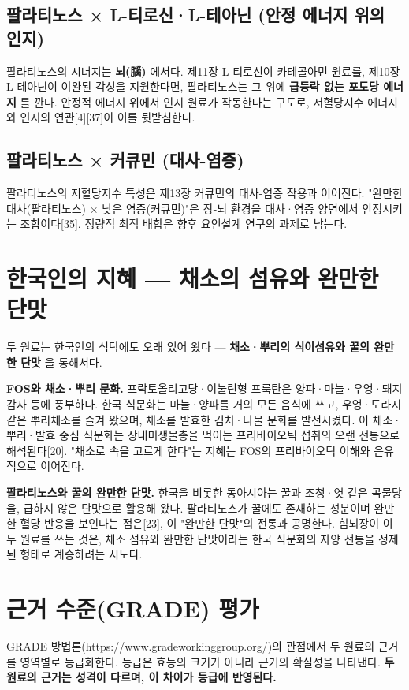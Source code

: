 \documentclass[11pt,oneside]{book}
\begin{document}
\subsection{팔라티노스 × L-티로신·L-테아닌 (안정 에너지 위의 인지)}
팔라티노스의 시너지는 \textbf{뇌(腦)} 에서다. 제11장 L-티로신이 카테콜아민 원료를, 제10장 L-테아닌이 이완된 각성을 지원한다면, 팔라티노스는 그 위에 \textbf{급등락 없는 포도당 에너지} 를 깐다. 안정적 에너지 위에서 인지 원료가 작동한다는 구도로, 저혈당지수 에너지와 인지의 연관[4][37]이 이를 뒷받침한다.

\subsection{팔라티노스 × 커큐민 (대사-염증)}
팔라티노스의 저혈당지수 특성은 제13장 커큐민의 대사-염증 작용과 이어진다. "완만한 대사(팔라티노스) × 낮은 염증(커큐민)"은 장-뇌 환경을 대사·염증 양면에서 안정시키는 조합이다[35]. 정량적 최적 배합은 향후 요인설계 연구의 과제로 남는다.

\section{한국인의 지혜 — 채소의 섬유와 완만한 단맛}
두 원료는 한국인의 식탁에도 오래 있어 왔다 — \textbf{채소·뿌리의 식이섬유와 꿀의 완만한 단맛} 을 통해서다.

\textbf{FOS와 채소·뿌리 문화.} 프락토올리고당·이눌린형 프룩탄은 양파·마늘·우엉·돼지감자 등에 풍부하다. 한국 식문화는 마늘·양파를 거의 모든 음식에 쓰고, 우엉·도라지 같은 뿌리채소를 즐겨 왔으며, 채소를 발효한 김치·나물 문화를 발전시켰다. 이 채소·뿌리·발효 중심 식문화는 장내미생물총을 먹이는 프리바이오틱 섭취의 오랜 전통으로 해석된다[20]. "채소로 속을 고르게 한다"는 지혜는 FOS의 프리바이오틱 이해와 은유적으로 이어진다.

\textbf{팔라티노스와 꿀의 완만한 단맛.} 한국을 비롯한 동아시아는 꿀과 조청·엿 같은 곡물당을, 급하지 않은 단맛으로 활용해 왔다. 팔라티노스가 꿀에도 존재하는 성분이며 완만한 혈당 반응을 보인다는 점은[23], 이 "완만한 단맛"의 전통과 공명한다. 힘뇌장이 이 두 원료를 쓰는 것은, 채소 섬유와 완만한 단맛이라는 한국 식문화의 자양 전통을 정제된 형태로 계승하려는 시도다.

\section{근거 수준(GRADE) 평가}
GRADE 방법론(https://www.gradeworkinggroup.org/)의 관점에서 두 원료의 근거를 영역별로 등급화한다. 등급은 효능의 크기가 아니라 근거의 확실성을 나타낸다. \textbf{두 원료의 근거는 성격이 다르며, 이 차이가 등급에 반영된다.}
\end{document}
